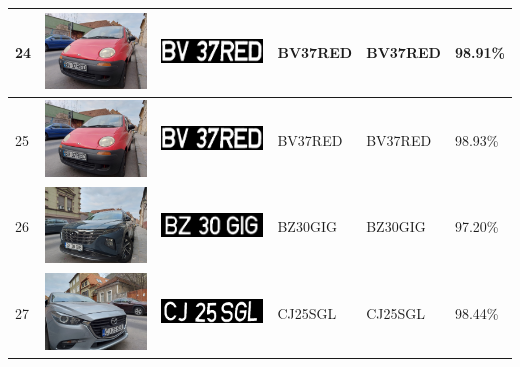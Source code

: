 \documentclass[a4paper,12pt]{report}
\begin{document}
\begin{longtable}{| m{0.6cm} | m{3cm} | m{3cm} | m{1.8cm} | m{1.8cm} | m{1.8cm} |}
    24  & \includegraphics[width=3cm,keepaspectratio]{dataset/12_d1.jpg}  & \includegraphics[width=3cm,keepaspectratio]{segmentari/24.jpg}  & BV37RED             & BV37RED              & 98.91\%    \\ \hline
    25  & \includegraphics[width=3cm,keepaspectratio]{dataset/12_d2.jpg}  & \includegraphics[width=3cm,keepaspectratio]{segmentari/25.jpg}  & BV37RED             & BV37RED              & 98.93\%    \\ \hline
    26  & \includegraphics[width=3cm,keepaspectratio]{dataset/13_d1.jpg}  & \includegraphics[width=3cm,keepaspectratio]{segmentari/26.jpg}  & BZ30GIG             & BZ30GIG              & 97.20\%    \\ \hline
    27  & \includegraphics[width=3cm,keepaspectratio]{dataset/14_s1.jpg}  & \includegraphics[width=3cm,keepaspectratio]{segmentari/27.jpg}  & CJ25SGL             & CJ25SGL              & 98.44\%    \\ \hline

\end{longtable}
\end{document}
